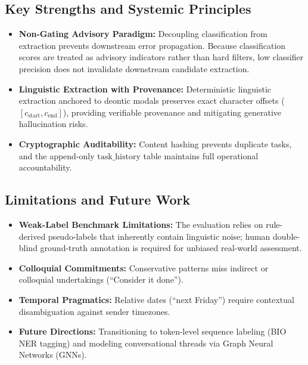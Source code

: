\documentclass[conference]{IEEEtran}
\begin{document}
\subsection{Key Strengths and Systemic Principles}
\begin{itemize}
    \item \textbf{Non-Gating Advisory Paradigm:} Decoupling classification from extraction prevents downstream error propagation. Because classification scores are treated as advisory indicators rather than hard filters, low classifier precision does not invalidate downstream candidate extraction.
    \item \textbf{Linguistic Extraction with Provenance:} Deterministic linguistic extraction anchored to deontic modals preserves exact character offsets ($[c_{\text{start}}, c_{\text{end}}]$), providing verifiable provenance and mitigating generative hallucination risks.
    \item \textbf{Cryptographic Auditability:} Content hashing prevents duplicate tasks, and the append-only $\text{task\_history}$ table maintains full operational accountability.
\end{itemize}

\subsection{Limitations and Future Work}
\begin{itemize}
    \item \textbf{Weak-Label Benchmark Limitations:} The evaluation relies on rule-derived pseudo-labels that inherently contain linguistic noise; human double-blind ground-truth annotation is required for unbiased real-world assessment.
    \item \textbf{Colloquial Commitments:} Conservative patterns miss indirect or colloquial undertakings (``Consider it done'').
    \item \textbf{Temporal Pragmatics:} Relative dates (``next Friday'') require contextual disambiguation against sender timezones.
    \item \textbf{Future Directions:} Transitioning to token-level sequence labeling (BIO NER tagging) and modeling conversational threads via Graph Neural Networks (GNNs).
\end{itemize}
\end{document}
